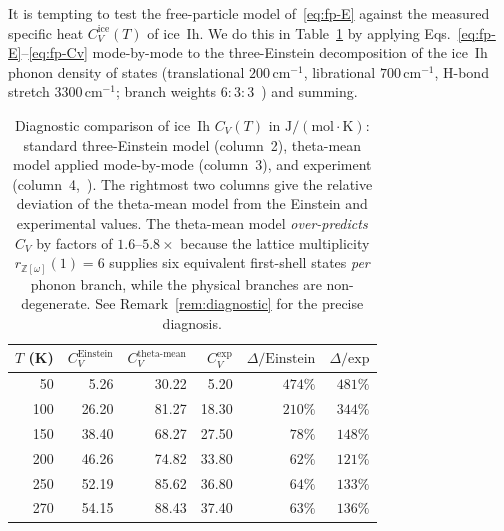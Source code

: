 \documentclass[11pt,letterpaper]{article}
\theoremstyle{plain}
\theoremstyle{definition}
\newcommand{\Eisenstein}{\mathbb{Z}[\omega]}
\begin{document}
It is tempting to test the free-particle model of~\eqref{eq:fp-E}
against the measured specific heat $C_V^{\text{ice}}(T)$ of ice~Ih.
We do this in Table~\ref{tab:phonon-vs-theta} by applying
Eqs.~\eqref{eq:fp-E}--\eqref{eq:fp-Cv} mode-by-mode to the
three-Einstein decomposition of the ice~Ih phonon density of states
(translational $200\,\mathrm{cm}^{-1}$, librational
$700\,\mathrm{cm}^{-1}$, H-bond stretch $3300\,\mathrm{cm}^{-1}$;
branch weights $6:3:3$~\cite{IceIhPhonons}) and summing.

\begin{table}[ht]
\centering
\begin{tabular}{rrrrrr}
\toprule
$T$ (K) & $C_V^{\text{Einstein}}$ & $C_V^{\text{theta-mean}}$ & $C_V^{\text{exp}}$ &
        $\Delta/\text{Einstein}$ & $\Delta/\text{exp}$ \\
\midrule
50  & 5.26  & 30.22 & 5.20  & $474\%$ & $481\%$ \\
100 & 26.20 & 81.27 & 18.30 & $210\%$ & $344\%$ \\
150 & 38.40 & 68.27 & 27.50 & $78\%$  & $148\%$ \\
200 & 46.26 & 74.82 & 33.80 & $62\%$  & $121\%$ \\
250 & 52.19 & 85.62 & 36.80 & $64\%$  & $133\%$ \\
270 & 54.15 & 88.43 & 37.40 & $63\%$  & $136\%$ \\
\bottomrule
\end{tabular}
\caption{Diagnostic comparison of ice~Ih $C_V(T)$ in
$\mathrm{J}/(\mathrm{mol}\cdot\mathrm{K})$: standard three-Einstein
model (column~2), theta-mean model
applied mode-by-mode (column~3), and experiment
(column~4,~\cite{FeistelWagner2006}).  The rightmost two columns
give the relative deviation of the theta-mean model from the
Einstein and experimental values.  The theta-mean model
\emph{over-predicts} $C_V$ by factors of $1.6$--$5.8\times$ because
the lattice multiplicity $r_{\Eisenstein}(1)=6$ supplies six
equivalent first-shell states \emph{per} phonon branch, while the
physical branches are non-degenerate.  See
Remark~\ref{rem:diagnostic} for the precise diagnosis.}
\label{tab:phonon-vs-theta}
\end{table}
\end{document}
